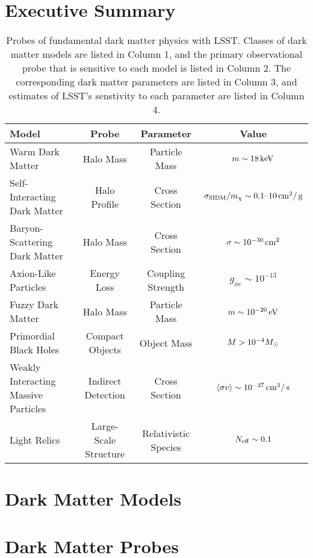 \documentclass[12pt]{article}
\begin{document}
\pagebreak

\section{Executive Summary}

\begin{table}[t]
\begin{center}
\begin{tabular}{l c c c}
\hline 
Model & Probe & Parameter & Value \\
\hline 
\hline
Warm Dark Matter  & Halo Mass & Particle Mass & $m \sim 18 \mathrm{\,keV}$ \\
Self-Interacting Dark Matter & Halo Profile & Cross Section & $\sigma_{\rm SIDM}/m_\chi \sim 0.1\text{--}10\mathrm{\,cm}^2/\mathrm{\,g}$ \\
Baryon-Scattering Dark Matter & Halo Mass & Cross Section & $\sigma \sim 10^{-30} \mathrm{\,cm}^2$ \\
Axion-Like Particles & Energy Loss & Coupling Strength & $g_{\phi e} \sim 10^{-13} $ \\
Fuzzy Dark Matter & Halo Mass & Particle Mass & $m \sim 10^{-20} \mathrm{\,eV}$  \\
Primordial Black Holes  & Compact Objects & Object Mass & $M > 10^{-4} M_\odot$ \\
Weakly Interacting Massive Particles & Indirect Detection & Cross Section & $\langle \sigma v \rangle \sim 10^{-27} \mathrm{\,cm}^3/\mathrm{\,s}$ \\
Light Relics & Large-Scale Structure & Relativistic Species & $N_{\rm eff} \sim 0.1$ \\[+0.5em]
\hline
\end{tabular}
\end{center}
\caption{\label{tab:models} Probes of fundamental dark matter physics with LSST. Classes of dark matter models are listed in Column 1, and the primary observational probe that is sensitive to each model is listed in Column 2. The corresponding dark matter parameters are listed in Column 3, and estimates of LSST's senstivity to each parameter are listed in Column 4.}
\end{table}


\section{Dark Matter Models}

\section{Dark Matter Probes}
\end{document}
